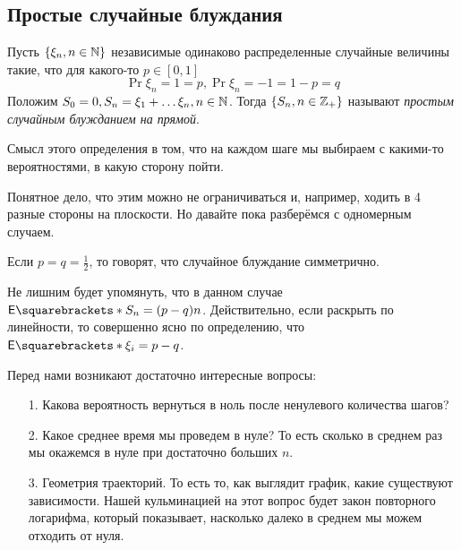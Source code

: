 \begin{example}
\begin{center}
\end{center}
\end{example}

\subsection{Простые случайные блуждания}

\begin{definition}
  Пусть $\{\xi_n, n \in \mathbb{N}\}$ независимые одинаково распределенные случайные
  величины такие, что для какого-то $p \in [0, 1]$
  \[
    \Pr{\xi_n = 1} = p, \Pr{\xi_n = -1} = 1 - p = q
  \]
  Положим $S_0 = 0, S_n = \xi_1 + \ldots \xi_n,
  n \in \mathbb{N}$. Тогда $\{S_n, n \in \mathbb{Z}_{+}\}$ называют \emph{простым случайным
  блужданием на прямой}.
\end{definition}

Смысл этого определения в том, что на каждом шаге мы выбираем с какими-то вероятностями, в какую сторону пойти.

Понятное дело, что этим можно не ограничиваться и, например, ходить в 4 разные
стороны на плоскости. Но давайте пока разберёмся с одномерным случаем.

\begin{definition}
  Если $p = q = \frac{1}{2}$, то говорят, что случайное блуждание симметрично.
\end{definition}

\begin{remark}
  Не лишним будет упомянуть, что в данном случае $\E{S_n} = (p - q)n$. 
  Действительно, если раскрыть по линейности, то совершенно ясно по 
  определению, что $\E{\xi_i} = p - q$.
\end{remark}

Перед нами возникают достаточно интересные вопросы:

\begin{itemize}
  \item[1.] Какова вероятность вернуться в ноль после ненулевого количества шагов?
  \item[2.] Какое среднее время мы проведем в нуле? 
  То есть сколько в среднем раз мы окажемся в нуле при достаточно больших $n$.
  \item[3.] Геометрия траекторий. То есть то, как выглядит график, какие существуют зависимости.
  Нашей кульминацией на этот вопрос будет закон повторного логарифма, который показывает,
  насколько далеко в среднем мы можем отходить от нуля.
\end{itemize}

